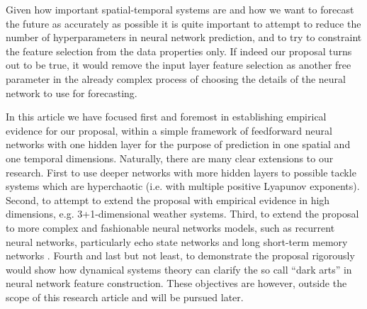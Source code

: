 \documentclass[journal]{IEEEtran}
\begin{document}
Given how important spatial-temporal systems are 
and how we want to forecast the future as accurately as possible 
it is quite 
important to attempt to reduce the number of hyperparameters in neural network prediction, and to try to constraint the feature selection from 
the data properties only. If indeed our proposal turns out to be true, it would remove the input layer feature selection as another free 
parameter in the already complex process of choosing the details of the neural network to use for forecasting.

In this article we have focused first and foremost in establishing empirical evidence for our proposal, within a simple framework of 
feedforward neural networks with one hidden layer for the purpose of prediction in one spatial and one temporal dimensions. Naturally, 
there are many clear extensions to our research. First to use deeper networks with more hidden 
layers to possible tackle systems which are hyperchaotic (i.e. with multiple positive Lyapunov exponents). Second, to attempt to extend the proposal with empirical evidence in high 
dimensions, e.g. 3+1-dimensional weather systems. Third, to extend the proposal to more complex and fashionable
neural networks models, such as recurrent neural networks\cite{COGS:COGS203}, particularly echo state networks \cite{2015arXiv151007146M,2017arXiv170805094M} 
and long short-term memory networks \cite{Hochreiter:1997:LSM:1246443.1246450}.
 Fourth and last but not least, to demonstrate the proposal rigorously would show how dynamical systems theory can clarify the so call
 ``dark arts'' in neural network feature construction. These objectives are however, outside the scope
 of this research article and will be pursued later.


%
\end{document}
